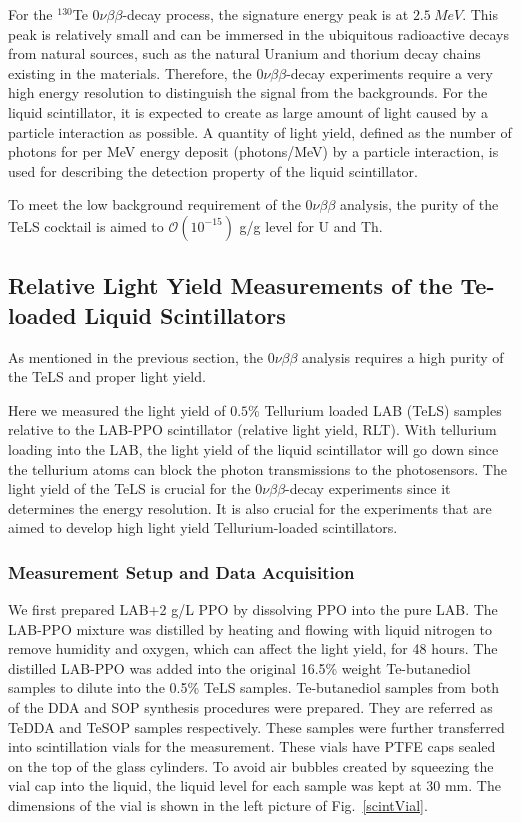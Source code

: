 For the $^{130}${Te} $0\nu\beta\beta$-decay process, the signature energy peak is at $2.5~MeV$\cite{whitepaper}. This peak is relatively small and can be immersed in the ubiquitous radioactive decays from natural sources, such as the natural Uranium and thorium decay chains existing in the materials\cite{whitepaper}. Therefore, the $0\nu\beta\beta$-decay experiments require a very high energy resolution to distinguish the signal from the backgrounds. For the liquid scintillator, it is expected to create as large amount of light caused by a particle interaction as possible. A quantity of light yield, defined as the number of photons for per MeV energy deposit (photons/MeV) by a particle interaction, is used for describing the detection property of the liquid scintillator.

To meet the low background requirement of the $0\nu\beta\beta$ analysis, the purity of the TeLS cocktail is aimed to $\mathcal{O}(10^{-15})$ g/g level for U and Th. 


\subsection{Relative Light Yield Measurements of the Te-loaded Liquid Scintillators}
As mentioned in the previous section, the $0\nu\beta\beta$ analysis requires a high purity of the TeLS and proper light yield. %

Here we measured the light yield of $0.5\%$ Tellurium loaded LAB (TeLS) samples relative to the LAB-PPO scintillator (relative light yield, RLT). With tellurium loading into the LAB, the light yield of the liquid scintillator will go down since the tellurium atoms can block the photon transmissions to the photosensors.  The light yield of the TeLS is crucial for the $0\nu\beta\beta$-decay experiments since it determines the energy resolution. It is also crucial for the experiments that are aimed to develop high light yield Tellurium-loaded scintillators\cite{biller2017new}.

\subsubsection{Measurement Setup and Data Acquisition}

We first prepared LAB+2 g/L PPO by dissolving PPO into the pure LAB. The LAB-PPO mixture was distilled by heating and flowing with liquid nitrogen to remove humidity and oxygen, which can affect the light yield, for 48 hours. The distilled LAB-PPO was added into the original 16.5\% weight Te-butanediol samples to dilute into the 0.5\% TeLS samples.  Te-butanediol samples from both of the DDA and SOP synthesis procedures were prepared. They are referred as TeDDA and TeSOP samples respectively. These samples were further transferred into scintillation vials for the measurement. These vials have PTFE caps sealed on the top of the glass cylinders. To avoid air bubbles created by squeezing the vial cap into the liquid, the liquid level for each sample was kept at 30 mm. The dimensions of the vial is shown in the left picture of Fig.~\ref{scintVial}.


